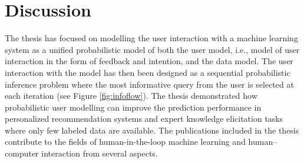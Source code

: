 \documentclass[dissertation,math,vertlayout,pdfa,colorlinks]{aaltoseries}
\begin{document}
\chapter{Discussion}

The thesis has focused on modelling the user interaction with a machine learning system as a unified probabilistic model of both the user model, i.e., model of user interaction in the form of feedback and intention, and the data model. The user interaction with the model has then been designed as a sequential probabilistic inference problem where the most informative query from the user is selected at each iteration (see Figure \ref{fig:infoflow}). The thesis demonstrated how probabilistic user modelling can improve the prediction performance in personalized recommendation systems and expert knowledge elicitation tasks where only few labeled data are available. The publications included in the thesis contribute to the fields of human-in-the-loop machine learning and human--computer interaction from several aspects.


\end{document}
